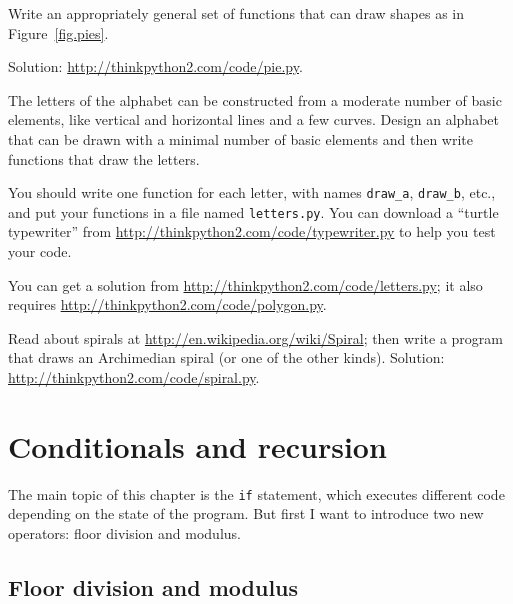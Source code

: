 \documentclass[10pt]{book}
\begin{document}
\begin{exercise}

Write an appropriately general set of functions that
can draw shapes as in Figure~\ref{fig.pies}.

Solution: \url{http://thinkpython2.com/code/pie.py}.

\end{exercise}

\begin{exercise}

The letters of the alphabet can be constructed from a moderate number
of basic elements, like vertical and horizontal lines and a few
curves.  Design an alphabet that can be drawn with a minimal
number of basic elements and then write functions that draw the letters.

You should write one function for each letter, with names
\verb"draw_a", \verb"draw_b", etc., and put your functions
in a file named {\tt letters.py}.  You can download a
``turtle typewriter'' from \url{http://thinkpython2.com/code/typewriter.py}
to help you test your code.

You can get a solution from \url{http://thinkpython2.com/code/letters.py};
it also requires
\url{http://thinkpython2.com/code/polygon.py}.

\end{exercise}

\begin{exercise}

Read about spirals at \url{http://en.wikipedia.org/wiki/Spiral}; then
write a program that draws an Archimedian spiral (or one of the other
kinds).  Solution: \url{http://thinkpython2.com/code/spiral.py}.

\end{exercise}


\chapter{Conditionals and recursion}

The main topic of this chapter is the {\tt if} statement, which
executes different code depending on the state of the program.
But first I want to introduce two new operators: floor division
and modulus.


\section{Floor division and modulus}
\end{document}
